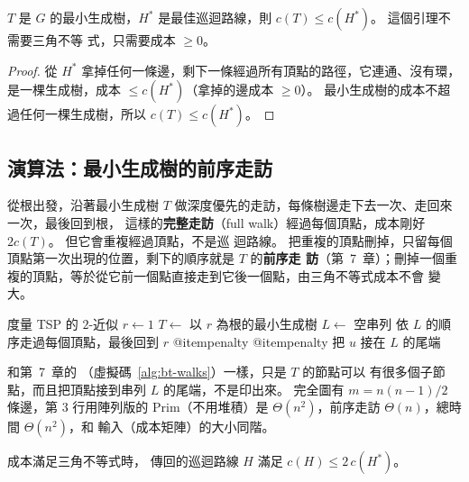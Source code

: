 \begin{lemma}
\label{lem:apx-mst-lb}
$T$ 是 $G$ 的最小生成樹，$H^*$ 是最佳巡迴路線，則 $c(T) \le c(H^*)$。 這個引理不需要三角不等
式，只需要成本 $\ge 0$。
\end{lemma}

\begin{proof}
從 $H^*$ 拿掉任何一條邊，剩下一條經過所有頂點的路徑，它連通、沒有環，是一棵生成樹，成本
$\le c(H^*)$（拿掉的邊成本 $\ge 0$）。 最小生成樹的成本不超過任何一棵生成樹，所以
$c(T) \le c(H^*)$。
\end{proof}

\subsection{演算法：最小生成樹的前序走訪}

從根出發，沿著最小生成樹 $T$ 做深度優先的走訪，每條樹邊走下去一次、走回來一次，最後回到根，
這樣的\textbf{完整走訪}（full walk）經過每個頂點，成本剛好 $2c(T)$。 但它會重複經過頂點，不是巡
迴路線。 把重複的頂點刪掉，只留每個頂點第一次出現的位置，剩下的順序就是 $T$ 的\textbf{前序走
訪}（第~7~章）；刪掉一個重複的頂點，等於從它前一個點直接走到它後一個點，由三角不等式成本不會
變大。

\begin{pseudo}[label=alg:apx-tsp, before upper={\csname @itempenalty\endcsname=10000\relax}]{度量 TSP 的 $2$-近似}
    \State $r \gets 1$ 
    \State $T \gets$ 以 $r$ 為根的最小生成樹 
    \State $L \gets$ 空串列
    \State {}
    \State \Return 依 $L$ 的順序走過每個頂點，最後回到 $r$
\EndFunction
\Statex \csname @itempenalty\relax %
 \csname @itempenalty\relax
    \State 把 $u$ 接在 $L$ 的尾端
     
        \State {}
    \EndFor
\EndProcedure
\end{pseudo}

 和第~7~章的 （虛擬碼~\ref{alg:bt-walks}）一樣，只是 $T$ 的節點可以
有很多個子節點，而且把頂點接到串列 $L$ 的尾端，不是印出來。 完全圖有 $m = n(n-1)/2$ 條邊，第 3
行用陣列版的 Prim（不用堆積）是 $\Theta(n^2)$，前序走訪 $\Theta(n)$，總時間 $\Theta(n^2)$，和
輸入（成本矩陣）的大小同階。

\begin{theorem}
\label{thm:apx-tsp}
成本滿足三角不等式時， 傳回的巡迴路線 $H$ 滿足 $c(H) \le 2\,c(H^*)$。
\end{theorem}

